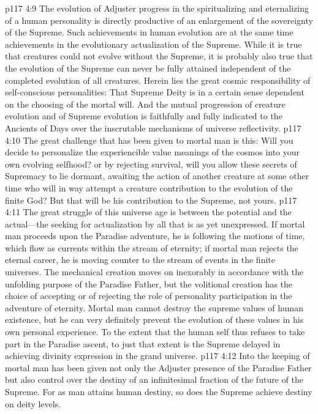 \vs p117 4:9 The evolution of Adjuster progress in the spiritualizing and eternalizing of a human personality is directly productive of an enlargement of the sovereignty of the Supreme. Such achievements in human evolution are at the same time achievements in the evolutionary actualization of the Supreme. While it is true that creatures could not evolve without the Supreme, it is probably also true that the evolution of the Supreme can never be fully attained independent of the completed evolution of all creatures. Herein lies the great cosmic responsibility of self\hyp{}conscious personalities: That Supreme Deity is in a certain sense dependent on the choosing of the mortal will. And the mutual progression of creature evolution and of Supreme evolution is faithfully and fully indicated to the Ancients of Days over the inscrutable mechanisms of universe reflectivity.
\vs p117 4:10 The great challenge that has been given to mortal man is this: Will you decide to personalize the experiencible value meanings of the cosmos into your own evolving selfhood? or by rejecting survival, will you allow these secrets of Supremacy to lie dormant, awaiting the action of another creature at some other time who will in  way attempt a creature contribution to the evolution of the finite God? But that will be his contribution to the Supreme, not yours.
\pc \vs p117 4:11 The great struggle of this universe age is between the potential and the actual---the seeking for actualization by all that is as yet unexpressed. If mortal man proceeds upon the Paradise adventure, he is following the motions of time, which flow as currents within the stream of eternity; if mortal man rejects the eternal career, he is moving counter to the stream of events in the finite universes. The mechanical creation moves on inexorably in accordance with the unfolding purpose of the Paradise Father, but the volitional creation has the choice of accepting or of rejecting the role of personality participation in the adventure of eternity. Mortal man cannot destroy the supreme values of human existence, but he can very definitely prevent the evolution of these values in his own personal experience. To the extent that the human self thus refuses to take part in the Paradise ascent, to just that extent is the Supreme delayed in achieving divinity expression in the grand universe.
\vs p117 4:12 Into the keeping of mortal man has been given not only the Adjuster presence of the Paradise Father but also control over the destiny of an infinitesimal fraction of the future of the Supreme. For as man attains human destiny, so does the Supreme achieve destiny on deity levels.
